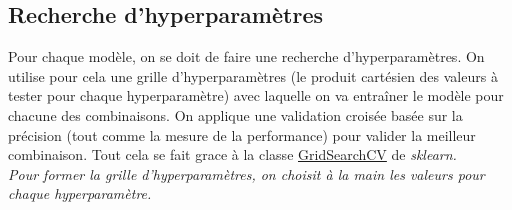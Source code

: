 \subsection{Recherche d'hyperparamètres}

Pour chaque modèle, on se doit de faire une recherche d'hyperparamètres. On utilise pour cela une grille d'hyperparamètres (le produit cartésien des valeurs à tester pour chaque hyperparamètre) avec laquelle on va entraîner le modèle pour chacune des combinaisons. On applique une validation croisée basée sur la précision (tout comme la mesure de la performance) pour valider la meilleur combinaison. Tout cela se fait grace à la classe \href{https://scikit-learn.org/stable/modules/generated/sklearn.model_selection.GridSearchCV.html}{GridSearchCV} de \it{sklearn}.\\

Pour former la grille d'hyperparamètres, on choisit à la main les valeurs pour chaque hyperparamètre.